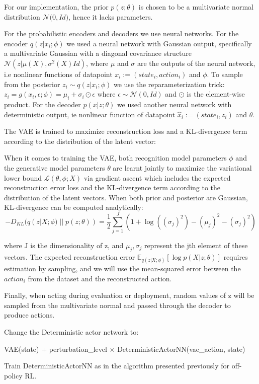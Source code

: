 For our implementation, the prior $p(z; \theta)$ is chosen to be a multivariate normal
distribution $\mathcal{N}\big( 0,Id\big )$, hence it lacks parameters.

For the probabilistic encoders and decoders we use neural networks.
For the encoder $q(z|x_i;\phi)$ we used a neural network with  Gaussian output, specifically a 
multivariate Gaussian with a diagonal covariance structure $\mathcal{N}(z | \mu(X), \sigma^2(X)Id)$,
where $\mu$ and $\sigma$ are the outputs of the neural network, i.e nonlinear 
functions of datapoint $x_i:=(state_i,action_i)$ and $\phi$.
To sample from the posterior $z_i \sim q(z|x_i; \phi)$ we use the reparameterization trick:
$z_i = g(x_i, \epsilon; \phi)=\mu_i + \sigma_i \odot \epsilon$ where $\epsilon \sim  \mathcal{N}(0,Id)$
and $\odot$ is the element-wise product.
For the decoder $p(x|z; \theta)$ we used another neural network with deterministic output, ie nonlinear function of 
datapoint $\hat x_i:=(state_i,z_i)$ and $\theta$.


The VAE is trained to maximize  reconstruction loss and a KL-divergence term according to the distribution of
the latent vector:

When it comes to training the VAE, both recognition model parameters $\phi$ and the generative model parameters $\theta$ are
learnt jointly to maximize the variational lower bound $\mathcal{L}(\theta, \phi; X)$ via gradient ascent which includes the
expected reconstruction error loss and the KL-divergence term according to the distribution of the latent vectors.
When both prior and posterior are Gaussian, KL-divergence can be computed analytically:
\begin{equation}
    - D_{KL}(q(z|X;\phi)\; ||\;p(z; \theta)) = \frac{1}{2}\sum_{j=1}^J (1+\log((\sigma_j)^2)-(\mu_j)^2-(\sigma_j)^2)
\end{equation}

where J is the dimensionality of z, and $\mu_j,\sigma_j$ represent the jth element of these vectors.
The expected reconstruction error 
$\mathbb E_{q(z|X;\phi)} [\log p(X|z; \theta)]$
requires estimation by sampling, and we will use the mean-squared error between the $action_i$ from the dataset and the reconstructed
action.

Finally, when acting during evaluation or deployment, random values of z will be sampled from the multivariate normal
and passed through the decoder to produce actions.



Change the Deterministic actor network to:

VAE(state) + perturbation\_level $\times$ DeterministicActorNN(vae\_action, state)

Train DeterministicActorNN as in the algorithm presented previously for off-policy RL.